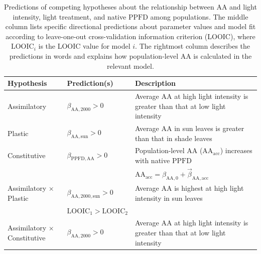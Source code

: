 \documentclass[
  letterpaper,
  DIV=11,
  numbers=noendperiod]{scrartcl}
\newcommand{\aax}{$\mathrm{AA}$}
\newcommand{\ppfd}{$\mathrm{PPFD}$}
\begin{document}
\begin{longtable}{>{\raggedright\arraybackslash}p{1in}>{\raggedright\arraybackslash}p{1.5in}>{\raggedright\arraybackslash}p{3in}}

\caption{\label{tbl-predictions}Predictions of competing hypotheses
about the relationship between \aax{} and light intensity, light
treatment, and native \ppfd{} among populations. The middle column lists
specific directional predictions about parameter values and model fit
according to leave-one-out cross-validation information criterion
(LOOIC), where \(\text{LOOIC}_i\) is the LOOIC value for model \(i\).
The rightmost column describes the predictions in words and explains how
population-level \aax{} is calculated in the relevant model.}

\tabularnewline

\toprule
\textbf{Hypothesis} & \textbf{Prediction(s)} & \textbf{Description}\\
\midrule
Assimilatory & $\beta_{\mathrm{AA},2000} > 0$ & \hspace{-1em}Average \aax{} at high light intensity is greater than that at low light intensity\\
\cmidrule{1-3}\pagebreak[0]
Plastic & $\beta_{\mathrm{AA},\text{sun}} > 0$ & \hspace{-1em}Average \aax{} in sun leaves is greater than that in shade leaves\\
\cmidrule{1-3}\pagebreak[0]
Constitutive & $\beta_{\mathrm{PPFD,AA}} > 0$ & \hspace{-1em}Population-level \aax{} ($\mathrm{AA}_\text{acc}$) increases with native \ppfd\\
\nopagebreak
 &  & \hspace{-1em}$\mathrm{AA}_\text{acc} = \beta_{\mathrm{AA}, 0} + \vec{\beta}_{\mathrm{AA}, \text{acc}}$\\
\cmidrule{1-3}\pagebreak[0]
Assimilatory $\times$ Plastic & $\beta_{\mathrm{AA},2000,\text{sun}} > 0$ & \hspace{-1em}Average \aax{} is highest at high light intensity in sun leaves\\
\nopagebreak
 & $\text{LOOIC}_\text{1} > \text{LOOIC}_\text{2}$ & \hspace{-1em}\\
\cmidrule{1-3}\pagebreak[0]
Assimilatory $\times$ Constitutive & $\beta_{\mathrm{AA},2000} > 0$ & \hspace{-1em}Average \aax{} at high light intensity is greater than that at low light intensity\\

\end{longtable}
\end{document}
